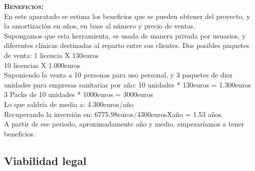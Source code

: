 \textbf{\textsc{Beneficios:}}\\
En este aparatado se estima los beneficios que se pueden obtener del proyecto, y la amortización en años, en base al número y precio de ventas.\\
Supongamos que esta herramienta, es usada de manera privada por usuarios, y diferentes clínicas destinadas al reparto entre sus clientes.
Dos posibles paquetes de venta:
1 licencia X 130euros\\
10 licencias X 1.000euros\\
Suponiendo la venta a 10 personas para uso personal, y 3 paquetes de diez unidades para empresas sanitarias por año:
10 unidades * 130euros = 1.300euros\\
3 Packs de 10 unidades * 1000euros = 3000euros\\
Lo que saldría de media a: 4.300euros/año\\
Recuperando la inversión en: 6775.98euros/4300eurosXaño = 1.53 años.\\
A partir de ese periodo, aproximadamente año y medio, empezaríamos a tener beneficios.

\subsection{Viabilidad legal}
